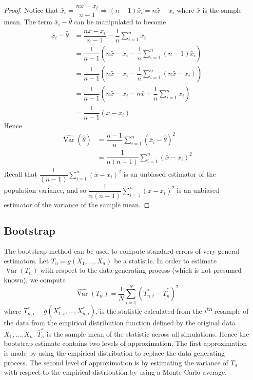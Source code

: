 \documentclass[11pt]{report} %
\begin{document}
\begin{proof}
Notice that $\bar{x}_{i} = \dfrac{n\bar{x} - x_{i}}{n - 1} \Rightarrow \left(n - 1\right)\bar{x}_{i} = n\bar{x} - x_{i}$ where $\bar{x}$ is the sample mean. The term $\bar{x}_{i} - \hat{\theta}$ can be manipulated to become
\begin{align}
\bar{x}_{i} - \hat{\theta} &= \dfrac{n\bar{x} - x_{i}}{n - 1} - \dfrac{1}{n}\sum_{i = 1}^{n}\bar{x}_{i} \\
&= \dfrac{1}{n - 1}\left(n\bar{x} - x_{i} - \dfrac{1}{n}\sum_{i = 1}^{n}\left(n - 1\right)\bar{x}_{i}\right) \\
&= \dfrac{1}{n - 1}\left(n\bar{x} - x_{i} - \dfrac{1}{n}\sum_{i = 1}^{n}\left(n\bar{x} - x_{i}\right)\right) \\
&= \dfrac{1}{n - 1}\left(n\bar{x} - x_{i} - n\bar{x} + \dfrac{1}{n}\sum_{i = 1}^{n}x_{i}\right) \\
&= \dfrac{1}{n - 1}\left(\bar{x} - x_{i}\right)
\end{align}
Hence
\begin{align}
\hat{\operatorname{Var}}\left(\hat{\theta}\right) &= \dfrac{n - 1}{n}\sum_{i = 1}^{n}\left(\bar{x}_{i} - \hat{\theta}\right)^{2} \\
&= \dfrac{1}{n\left(n - 1\right)}\sum_{i = 1}^{n}\left(\bar{x} - x_{i}\right)^{2}
\end{align}
Recall that $\dfrac{1}{\left(n - 1\right)}\sum_{i = 1}^{n}\left(\bar{x} - x_{i}\right)^{2}$ is an unbiased estimator of the population variance, and so $\dfrac{1}{n\left(n - 1\right)}\sum_{i = 1}^{n}\left(\bar{x} - x_{i}\right)^{2}$ is an unbiased estimator of the variance of the sample mean.
\end{proof}

\subsection{Bootstrap \cite{Wasserman2013}}

The bootstrap method can be used to compute standard errors of very general estimators. Let $T_{n} = g\left(X_{1}, \dots, X_{n}\right)$ be a statistic. In order to estimate $\operatorname{Var}\left(T_{n}\right)$ with respect to the data generating process (which is not presumed known), we compute
\begin{equation}
\hat{\operatorname{Var}}\left(T_{n}\right) = \dfrac{1}{N}\sum_{i = 1}^{N}\left(T_{n, i}^{*} - \overline{T}_{n}^{*}\right)^{2}
\end{equation}
where $T_{n, i}^{*} = g\left(X_{1, i}^{*}, \dots, X_{n, i}^{*}\right)$, is the statistic calculated from the $i$\textsuperscript{th} resample of the data from the empirical distribution function defined by the original data $X_{1}, \dots, X_{n}$. $\overline{T}_{n}^{*}$ is the sample mean of the statistic across all simulations. Hence the bootstrap estimate contains two levels of approximation. The first approximation is made by using the empirical distribution to replace the data generating process. The second level of approximation is by estimating the variance of $T_{n}$ with respect to the empirical distribution by using a Monte Carlo average.
\end{document}
